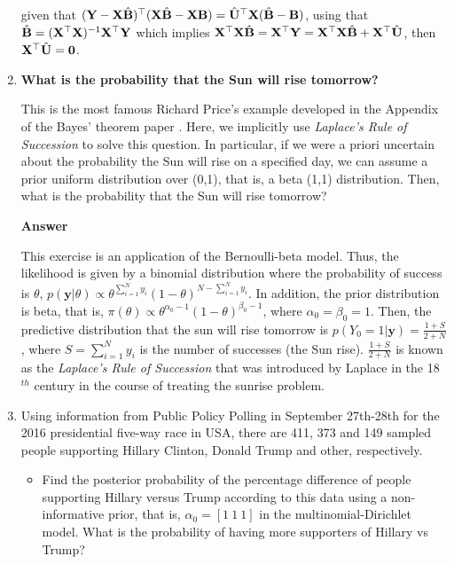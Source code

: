 \begin{enumerate}[leftmargin=*]
given that $({\bf{Y}}-{\bf{X}}\hat{{\bf{B}}})^{\top}({\bf{X}}\hat{{\bf{B}}}-{\bf{X}}{\bf{B}})=\hat{\bf{U}}^{\top}{\bf{X}}(\hat{{\bf{B}}}-{\bf{B}})$, using that $\hat{{\bf{B}}}=({\bf{X}}^{\top}{\bf{X}})^{-1}{\bf{X}}^{\top}{\bf{Y}}$ which implies ${\bf{X}}^{\top}{\bf{X}}\hat{{\bf{B}}}={\bf{X}}^{\top}{\bf{Y}}={\bf{X}}^{\top}{\bf{X}}\hat{\bf{B}}+{\bf{X}}^{\top}\hat{\bf{U}}$, then ${\bf{X}}^{\top}\hat{\bf{U}}={\bf{0}}$.

	\item \textbf{What is the probability that the Sun will rise tomorrow?}

This is the most famous Richard Price's example developed in the Appendix of the Bayes' theorem paper \cite{bayes1763lii}. Here, we implicitly use \textit{Laplace's Rule of Succession} to solve this question. In particular, if we were a priori uncertain about the probability the Sun will rise on a specified day, we can assume a prior uniform distribution over (0,1), that is, a beta (1,1) distribution. Then, what is the probability that the Sun will rise tomorrow?

\textbf{Answer}

This exercise is an application of the Bernoulli-beta model. Thus, the likelihood is given by a binomial distribution where the probability of success is $\theta$, $p(\mathbf{y}|\theta)\propto\theta^{\sum_{i=1}^N y_i}(1-\theta)^{N-\sum_{i=1}^N y_i}$. In addition, the prior distribution is beta, that is, $\pi(\theta)\propto \theta^{\alpha_0-1}(1-\theta)^{\beta_0-1}$, where $\alpha_0=\beta_0=1$. Then, the predictive distribution that the sun will rise tomorrow is  $p(Y_0=1|\mathbf{y})=\frac{1+S}{2+N}$, where $S=\sum_{i=1}^N y_i$ is the number of successes (the Sun rise). $\frac{1+S}{2+N}$ is known as the \textit{Laplace's Rule of Succession} that was introduced by Laplace in the 18$^{th}$ century in the course of treating the sunrise problem.  

	\item Using information from Public Policy Polling in September 27th-28th for the 2016 presidential five-way race in USA, there are 411, 373 and 149 sampled people supporting Hillary Clinton, Donald Trump and other, respectively. 

\begin{itemize}
	\item Find the posterior probability of the percentage difference of people supporting Hillary versus Trump according to this data using a non-informative prior, that is, $\alpha_0=[1 \ 1 \ 1]$ in the multinomial-Dirichlet model. What is the probability of having more supporters of Hillary vs Trump?
	

\end{itemize}
\end{enumerate}
